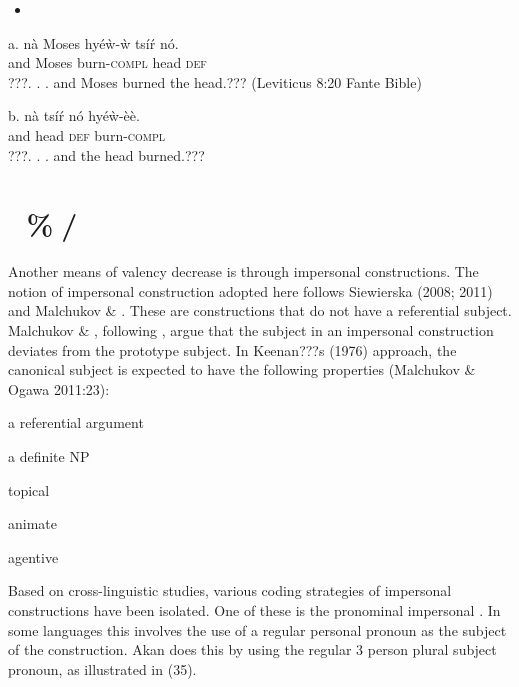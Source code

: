 \documentclass[output=paper]{langsci/langscibook}
\begin{document}
\begin{itemize}
\item \end{itemize}
\gll a.  n\`{a}  Moses    hy\'{e}\`{w}-\`{w}   ts\'{i}\'{r}  n\'{o}.\\
       and   Moses     burn-\textsc{compl}  head  \textsc{def}\\
\glt ???. . .  and Moses burned the head.??? (Leviticus 8:20 Fante Bible)
\z

\gll  b.  n\`{a}  ts\'{i}\'{r}   n\'{o}  hy\'{e}\`{w}-\`{e}\`{e}.\\
       and  head  \textsc{def}  burn-\textsc{compl}  \\
\glt ???. .  . and the head burned.???
\z

\section{ \%/}

Another means of valency decrease is through impersonal constructions. The notion of impersonal construction adopted here follows Siewierska (2008; 2011) and Malchukov \& \citet{Ogawa2011}. These are constructions that do not have a referential subject. Malchukov \& \citet{Ogawa2011}, following \citet{Keenan1976}, argue that the subject in an impersonal construction deviates from the prototype subject. In Keenan???s (1976) approach, the canonical subject is expected to have the following properties (Malchukov \& Ogawa 2011:23):

\begin{styleNoSpacing}
a referential argument
\end{styleNoSpacing}

\begin{styleNoSpacing}
a definite NP
\end{styleNoSpacing}

\begin{styleNoSpacing}
topical
\end{styleNoSpacing}

\begin{styleNoSpacing}
animate
\end{styleNoSpacing}

\begin{styleNoSpacing}
agentive
\end{styleNoSpacing}

Based on cross-linguistic studies, various coding strategies of impersonal constructions have been isolated. One of these is the pronominal impersonal \citep{Siewierska2011}. In some languages this involves the use of a regular personal pronoun as the subject of the construction. Akan does this by using the regular 3 person plural subject pronoun, as illustrated in (35).
\end{document}
